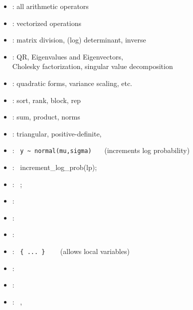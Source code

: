 \documentclass[10pt]{report}
\begin{document}
%
\begin{itemize}\small
\item {}: all arithmetic operators
\item {}: vectorized operations
\item {}: matrix division, (log) determinant,
  inverse 
\item {}: QR, Eigenvalues and Eigenvectors, 
  \\
  Cholesky factorization, singular value decomposition
\item {}: quadratic forms, variance scaling, etc.
\item {}: sort, rank, block, rep
\item {}: sum, product, norms
\item {}: triangular, positive-definite,
\end{itemize}


%
\vspace*{-4pt}
\begin{itemize}
\item {}: \ {\footnotesize \Verb|y ~ normal(mu,sigma)|}
  \ \ \ {\footnotesize (increments log probability)}
\item {}: \ {\footnotesize increment\_log\_prob(lp);}
\item {}: \  {\footnotesize {};}
\item {}: \ {\footnotesize {}}
\item {}: \ {\footnotesize {}}
\item {}: \ {\footnotesize
    }
\item {}: \ {\footnotesize \Verb|{ ... }|}  \ \ \ {\footnotesize
    (allows local variables)}
\item {}: \ {\footnotesize {}}
\item {}: 
\ {\footnotesize 
    }
\item {}: \ {\footnotesize {}, }
\end{itemize}
\end{document}
